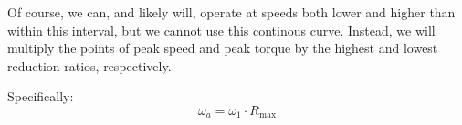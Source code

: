 \documentclass[12pt]{article}
\begin{document}
Of course, we can, and likely will,  operate at speeds both lower and higher than within this interval, but we cannot use this continous curve. Instead, we will multiply the points of peak speed and peak torque by the highest and lowest reduction ratios, respectively. 

Specifically:
\begin{equation}
  \omega_{a} = \omega_{1} \cdot R_{\max}
\end{equation}
\end{document}
